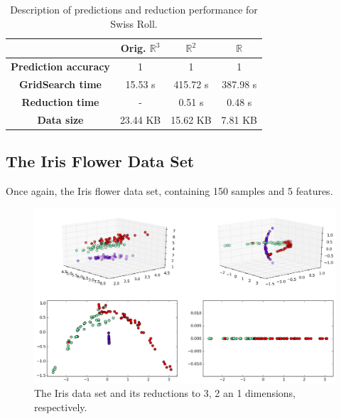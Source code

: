 \documentclass[12pt]{report}
\begin{document}
\begin{table}[H]
	\centering
	\begin{tabular}{|c|c|c|c|}
		\hline
		& \textbf{Orig. $\mathbb{R}^3$} & \textbf{$\mathbb{R}^2$} & \textbf{$\mathbb{R}$} \\\hline
		\textbf{Prediction accuracy}   & 1            & 1             & 1     \\\hline
		\textbf{GridSearch time} & 15.53 s   & 415.72 s  & 387.98 s  \\\hline
		\textbf{Reduction time}  & -         & 0.51 s       & 0.48 s     \\\hline
		\textbf{Data size}          & 23.44 KB & 15.62 KB  & 7.81 KB   \\\hline
	\end{tabular}

	\caption{Description of predictions and reduction performance for Swiss Roll.}
\end{table}

\subsection{The Iris Flower Data Set}

Once again, the Iris flower data set, containing 150 samples and 5 features.

\begin{figure}[H]
	\centering
	\includegraphics[width=\linewidth]{experiments/iso_iris}
	\captionsetup{justification=centering}
	\caption{The Iris data set and its reductions to 3, 2 an 1 dimensions, respectively.}
\end{figure}
\end{document}
